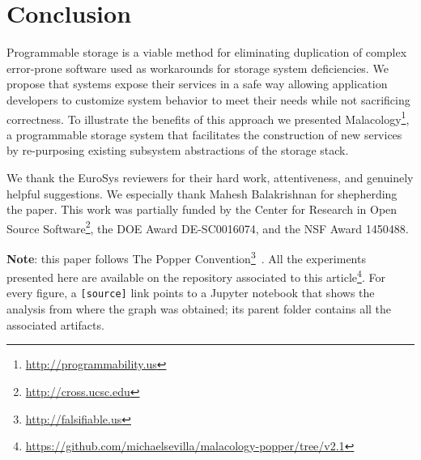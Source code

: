 \section{Conclusion}
\label{conclusion-and-future-work}

Programmable storage is a viable method for eliminating duplication of complex
error-prone software used as workarounds for storage system deficiencies. We
propose that systems expose their services in a safe way allowing application
developers to customize system behavior to meet their needs while not
sacrificing correctness. To illustrate the benefits of this approach we
presented Malacology\footnote{\url{http://programmability.us}}, a
programmable storage system that facilitates the construction of new services
by re-purposing existing subsystem abstractions of the storage stack. 


\acks

We thank the EuroSys reviewers for their hard work, attentiveness, and
genuinely helpful suggestions. We especially thank Mahesh Balakrishnan for
shepherding the paper. This work was partially funded by the
Center for Research in Open Source
Software\footnote{\url{http://cross.ucsc.edu}}, the DOE Award
DE-SC0016074, and the NSF Award 1450488.

\textbf{Note}: this paper follows The Popper
Convention\footnote{\url{http://falsifiable.us}}~\cite{jimenez_popper_2016}. All 
the experiments presented here are available on the repository associated to 
this 
article\footnote{\url{https://github.com/michaelsevilla/malacology-popper/tree/v2.1}}. 
For every figure, a \texttt{[source]} link points to a Jupyter notebook that 
shows the analysis from where the graph was obtained; its parent folder contains 
all the associated artifacts.
